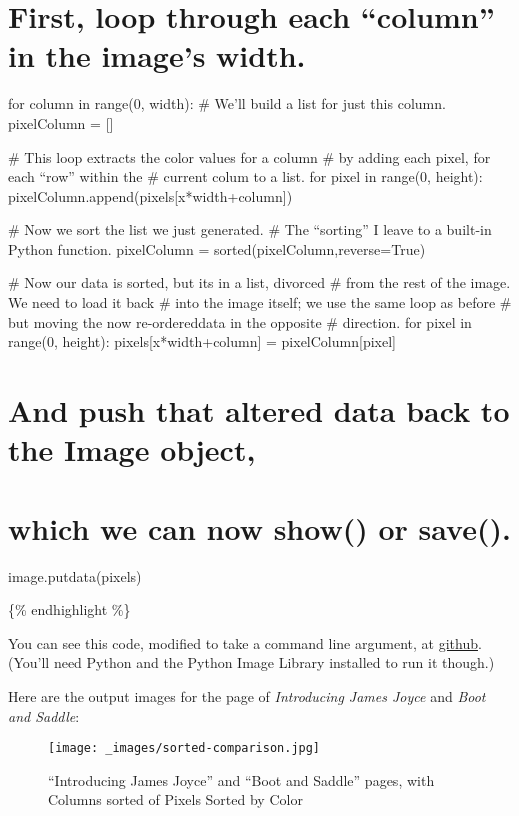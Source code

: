 \documentclass[
  12pt,
]{article}
\begin{document}
\hypertarget{first-loop-through-each-column-in-the-images-width.}{%
\section{First, loop through each ``column'' in the image's
width.}\label{first-loop-through-each-column-in-the-images-width.}}

for column in range(0, width): \# We'll build a list for just this
column. pixelColumn = {[}{]}

\# This loop extracts the color values for a column \# by adding each
pixel, for each ``row'' within the \# current colum to a list. for pixel
in range(0, height): pixelColumn.append(pixels{[}x*width+column{]})

\# Now we sort the list we just generated. \# The ``sorting'' I leave to
a built-in Python function. pixelColumn =
sorted(pixelColumn,reverse=True)

\# Now our data is sorted, but its in a list, divorced \# from the rest
of the image. We need to load it back \# into the image itself; we use
the same loop as before \# but moving the now re-ordereddata in the
opposite \# direction. for pixel in range(0, height):
pixels{[}x*width+column{]} = pixelColumn{[}pixel{]}

\hypertarget{and-push-that-altered-data-back-to-the-image-object}{%
\section{And push that altered data back to the Image
object,}\label{and-push-that-altered-data-back-to-the-image-object}}

\hypertarget{which-we-can-now-show-or-save.}{%
\section{which we can now show() or
save().}\label{which-we-can-now-show-or-save.}}

image.putdata(pixels)

\{\% endhighlight \%\}

You can see this code, modified to take a command line argument, at
\href{https://github.com/c-forster/imageAverage}{github}. (You'll need
Python and the Python Image Library installed to run it though.)

Here are the output images for the page of \emph{Introducing James
Joyce} and \emph{Boot and Saddle}:

\par\begin{figure}\centering\texttt{[image: \_images/sorted-comparison.jpg]}\caption{“Introducing James Joyce” and “Boot and Saddle” pages, with Columns sorted of Pixels Sorted by Color}\end{figure}
\end{document}
